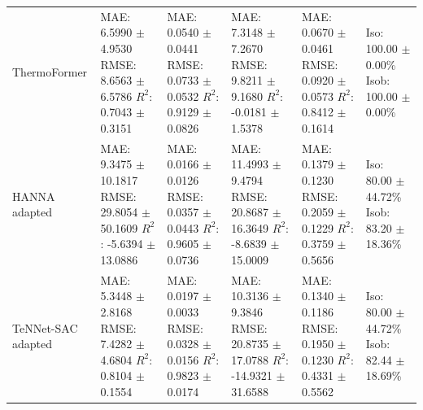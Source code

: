 \begin{tabular}{llllll}
ThermoFormer & \shortstack[l]{MAE: 6.5990 $\pm$ 4.9530 \\ RMSE: 8.6563 $\pm$ 6.5786 \\ $R^2$: 0.7043 $\pm$ 0.3151} & \shortstack[l]{MAE: 0.0540 $\pm$ 0.0441 \\ RMSE: 0.0733 $\pm$ 0.0532 \\ $R^2$: 0.9129 $\pm$ 0.0826} & \shortstack[l]{MAE: 7.3148 $\pm$ 7.2670 \\ RMSE: 9.8211 $\pm$ 9.1680 \\ $R^2$: -0.0181 $\pm$ 1.5378} & \shortstack[l]{MAE: 0.0670 $\pm$ 0.0461 \\ RMSE: 0.0920 $\pm$ 0.0573 \\ $R^2$: 0.8412 $\pm$ 0.1614} & \shortstack[l]{Iso: 100.00 $\pm$ 0.00\% \\ Isob: 100.00 $\pm$ 0.00\%} \\
HANNA adapted & \shortstack[l]{MAE: 9.3475 $\pm$ 10.1817 \\ RMSE: 29.8054 $\pm$ 50.1609 \\ $R^2$: -5.6394 $\pm$ 13.0886} & \shortstack[l]{MAE: 0.0166 $\pm$ 0.0126 \\ RMSE: 0.0357 $\pm$ 0.0443 \\ $R^2$: 0.9605 $\pm$ 0.0736} & \shortstack[l]{MAE: 11.4993 $\pm$ 9.4794 \\ RMSE: 20.8687 $\pm$ 16.3649 \\ $R^2$: -8.6839 $\pm$ 15.0009} & \shortstack[l]{MAE: 0.1379 $\pm$ 0.1230 \\ RMSE: 0.2059 $\pm$ 0.1229 \\ $R^2$: 0.3759 $\pm$ 0.5656} & \shortstack[l]{Iso: 80.00 $\pm$ 44.72\% \\ Isob: 83.20 $\pm$ 18.36\%} \\
TeNNet-SAC adapted & \shortstack[l]{MAE: 5.3448 $\pm$ 2.8168 \\ RMSE: 7.4282 $\pm$ 4.6804 \\ $R^2$: 0.8104 $\pm$ 0.1554} & \shortstack[l]{MAE: 0.0197 $\pm$ 0.0033 \\ RMSE: 0.0328 $\pm$ 0.0156 \\ $R^2$: 0.9823 $\pm$ 0.0174} & \shortstack[l]{MAE: 10.3136 $\pm$ 9.3846 \\ RMSE: 20.8735 $\pm$ 17.0788 \\ $R^2$: -14.9321 $\pm$ 31.6588} & \shortstack[l]{MAE: 0.1340 $\pm$ 0.1186 \\ RMSE: 0.1950 $\pm$ 0.1230 \\ $R^2$: 0.4331 $\pm$ 0.5562} & \shortstack[l]{Iso: 80.00 $\pm$ 44.72\% \\ Isob: 82.44 $\pm$ 18.69\%} \\

\end{tabular}
